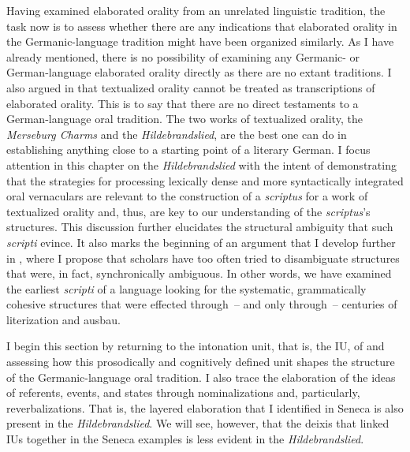   Having examined elaborated orality from an unrelated linguistic tradition, the task now is to assess whether there are any indications that elaborated orality in the Germanic-language tradition might have been organized similarly. As I have already mentioned, there is no possibility of examining any Germanic- or German-language elaborated orality directly as there are no extant traditions. I also argued in  that textualized orality cannot be treated as transcriptions of elaborated orality. This is to say that there are no direct testaments to a German-language oral tradition. The two works of textualized orality, the \textit{Merseburg Charms} and the \textit{Hildebrandslied}, are the best one can do in establishing anything close to a starting point of a literary German. I focus attention in this chapter on the \textit{Hildebrandslied} with the intent of demonstrating that the strategies for processing lexically dense and more syntactically integrated oral vernaculars are relevant to the construction of a \textit{scriptus} for a work of textualized orality and, thus, are key to our understanding of the \textit{scriptus}’s structures. This discussion further elucidates the structural ambiguity that such \textit{scripti} evince. It also marks the beginning of an argument that I develop further in , where I propose that scholars have too often tried to disambiguate structures that were, in fact, synchronically ambiguous. In other words, we have examined the earliest \textit{scripti} of a language looking for the systematic, grammatically cohesive structures that were effected through~-- and only through~-- centuries of literization and ausbau.

I begin this section by returning to the intonation unit, that is, the IU, of  and assessing how this prosodically and cognitively defined unit shapes the structure of the Germanic-language oral tradition. I also trace the elaboration of the ideas of referents, events, and states through nominalizations and, particularly, reverbalizations. That is, the layered elaboration that I identified in Seneca is also present in the \textit{Hildebrandslied}. We will see, however, that the deixis that linked IUs together in the Seneca examples is less evident in the \textit{Hildebrandslied}.

